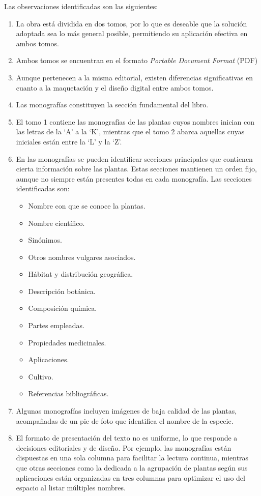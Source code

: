 Las observaciones identificadas son las siguientes:
\begin{enumerate}
    \item La obra está dividida en dos tomos, por lo que es deseable que la solución adoptada sea 
    lo más general posible, permitiendo su aplicación efectiva en ambos tomos.
    \item Ambos tomos se encuentran en el formato \textit{Portable Document Format} (PDF)
    \item Aunque pertenecen a la misma editorial, existen diferencias significativas 
    en cuanto a la maquetación y el diseño digital entre ambos tomos.
    \item Las monografías constituyen la sección fundamental del libro.
    \item El tomo 1 contiene las monografías de las plantas cuyos nombres inician con las letras de 
    la `A' a la `K', mientras que el tomo 2 abarca aquellas cuyas iniciales están entre la `L' y la `Z'.
    \item En las monografías se pueden identificar secciones principales que contienen cierta información 
    sobre las plantas. Estas secciones mantienen un orden fijo, aunque no siempre están 
    presentes todas en cada monografía. Las secciones identificadas son:
    \begin{itemize}
        \item Nombre con que se conoce la plantas.
        \item Nombre científico.
        \item Sinónimos.
        \item Otros nombres vulgares asociados.
        \item Hábitat y distribución geográfica.
        \item Descripción botánica.
        \item Composición química.
        \item Partes empleadas.
        \item Propiedades medicinales.
        \item Aplicaciones.
        \item Cultivo.
        \item Referencias bibliográficas.
    \end{itemize}
    \item Algunas monografías incluyen imágenes de baja calidad de las plantas, 
    acompañadas de un pie de foto que identifica el nombre de la especie.
    \item El formato de presentación del texto no es uniforme, lo que responde a decisiones editoriales y 
    de diseño. Por ejemplo, las monografías están dispuestas en una sola columna para facilitar la lectura continua, 
    mientras que otras secciones como la dedicada a la agrupación de plantas según sus aplicaciones 
    están organizadas en tres columnas para optimizar el uso del espacio al listar múltiples nombres.
\end{enumerate}

